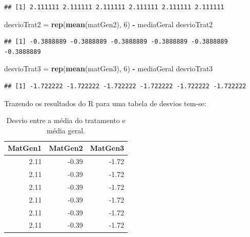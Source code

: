 \documentclass[
]{article}
\newenvironment{Shaded}{\begin{snugshade}}{\end{snugshade}}
\newcommand{\DecValTok}[1]{\textcolor[rgb]{0.00,0.00,0.81}{#1}}
\newcommand{\KeywordTok}[1]{\textcolor[rgb]{0.13,0.29,0.53}{\textbf{#1}}}
\newcommand{\NormalTok}[1]{#1}
\newcommand{\OperatorTok}[1]{\textcolor[rgb]{0.81,0.36,0.00}{\textbf{#1}}}
\newcommand{\StringTok}[1]{\textcolor[rgb]{0.31,0.60,0.02}{#1}}
\begin{document}
\begin{verbatim}
## [1] 2.111111 2.111111 2.111111 2.111111 2.111111 2.111111
\end{verbatim}

\begin{Shaded}
\begin{Highlighting}[]
\NormalTok{desvioTrat2 =}\StringTok{ }\KeywordTok{rep}\NormalTok{(}\KeywordTok{mean}\NormalTok{(matGen2), }\DecValTok{6}\NormalTok{) }\OperatorTok{-}\StringTok{ }\NormalTok{mediaGeral}
\NormalTok{desvioTrat2}
\end{Highlighting}
\end{Shaded}

\begin{verbatim}
## [1] -0.3888889 -0.3888889 -0.3888889 -0.3888889 -0.3888889 -0.3888889
\end{verbatim}

\begin{Shaded}
\begin{Highlighting}[]
\NormalTok{desvioTrat3 =}\StringTok{ }\KeywordTok{rep}\NormalTok{(}\KeywordTok{mean}\NormalTok{(matGen3), }\DecValTok{6}\NormalTok{) }\OperatorTok{-}\StringTok{ }\NormalTok{mediaGeral}
\NormalTok{desvioTrat3}
\end{Highlighting}
\end{Shaded}

\begin{verbatim}
## [1] -1.722222 -1.722222 -1.722222 -1.722222 -1.722222 -1.722222
\end{verbatim}

Trazendo os resultados do R para uma tabela de desvios tem-se:

\begin{table}

\caption{\label{tab:unnamed-chunk-19}Desvio entre a média do tratamento e média geral.}
\centering
\begin{tabular}[t]{r|r|r}
\hline
MatGen1 & MatGen2 & MatGen3\\
\hline
2.11 & -0.39 & -1.72\\
\hline
2.11 & -0.39 & -1.72\\
\hline
2.11 & -0.39 & -1.72\\
\hline
2.11 & -0.39 & -1.72\\
\hline
2.11 & -0.39 & -1.72\\
\hline
2.11 & -0.39 & -1.72\\
\hline
\end{tabular}
\end{table}
\end{document}
